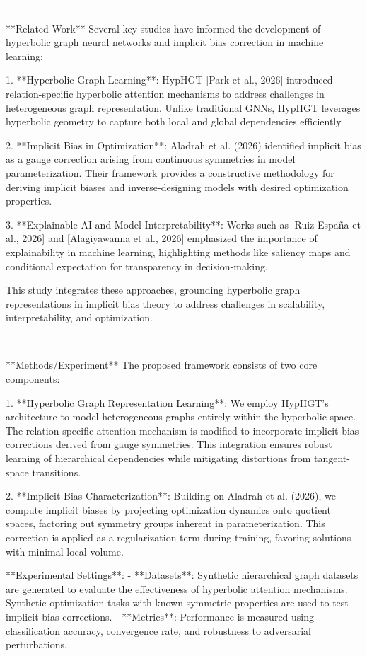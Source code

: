 ---

**Related Work**  
Several key studies have informed the development of hyperbolic graph neural networks and implicit bias correction in machine learning:

1. **Hyperbolic Graph Learning**: HypHGT [Park et al., 2026] introduced relation-specific hyperbolic attention mechanisms to address challenges in heterogeneous graph representation. Unlike traditional GNNs, HypHGT leverages hyperbolic geometry to capture both local and global dependencies efficiently.

2. **Implicit Bias in Optimization**: Aladrah et al. (2026) identified implicit bias as a gauge correction arising from continuous symmetries in model parameterization. Their framework provides a constructive methodology for deriving implicit biases and inverse-designing models with desired optimization properties.

3. **Explainable AI and Model Interpretability**: Works such as [Ruiz-España et al., 2026] and [Alagiyawanna et al., 2026] emphasized the importance of explainability in machine learning, highlighting methods like saliency maps and conditional expectation for transparency in decision-making.

This study integrates these approaches, grounding hyperbolic graph representations in implicit bias theory to address challenges in scalability, interpretability, and optimization.

---

**Methods/Experiment**  
The proposed framework consists of two core components:

1. **Hyperbolic Graph Representation Learning**:  
   We employ HypHGT's architecture to model heterogeneous graphs entirely within the hyperbolic space. The relation-specific attention mechanism is modified to incorporate implicit bias corrections derived from gauge symmetries. This integration ensures robust learning of hierarchical dependencies while mitigating distortions from tangent-space transitions.

2. **Implicit Bias Characterization**:  
   Building on Aladrah et al. (2026), we compute implicit biases by projecting optimization dynamics onto quotient spaces, factoring out symmetry groups inherent in parameterization. This correction is applied as a regularization term during training, favoring solutions with minimal local volume.

**Experimental Settings**:  
- **Datasets**: Synthetic hierarchical graph datasets are generated to evaluate the effectiveness of hyperbolic attention mechanisms. Synthetic optimization tasks with known symmetric properties are used to test implicit bias corrections.  
- **Metrics**: Performance is measured using classification accuracy, convergence rate, and robustness to adversarial perturbations.  

